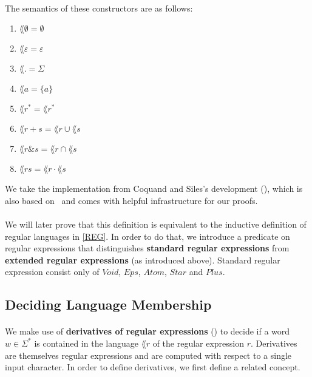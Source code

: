     \paragraph{} 
    The semantics of these constructors are as follows:
    \begin{enumerate}
        \item $\lang{\emptyset} = \emptyset$
        \item $\lang{\varepsilon} = \varepsilon$
        \item $\lang{.} = \Sigma$
        \item $\lang{a} = \{a\}$
        \item $\lang{r^*} = \lang{r}^*$
        \item $\lang{r + s} = \lang{r} \cup \lang{s}$
        \item $\lang{r \& s} = \lang{r} \cap \lang{s}$
        \item $\lang{r s} = \lang{r} \cdot \lang{s}$

    \end{enumerate}

    We take the implementation from Coquand and Siles's development (\cite{DBLP:conf/cpp/CoquandS11}), which is also based on \ssreflect\ and comes with helpful infrastructure for our proofs.



    \paragraph{}
    We will later prove that this definition is equivalent to the inductive definition of regular languages in \ref{REG}.
    In order to do that, we introduce a predicate on regular expressions that distinguishes \textbf{standard regular expressions} 
    from \textbf{extended regular expressions} (as introduced above).
    Standard regular expression consist only of $Void$, $Eps$, $Atom$, $Star$ and $Plus$.




    \subsection{Deciding Language Membership}
    \paragraph{}
    We make use of \textbf{derivatives of regular expressions} (\cite{DBLP:journals/jacm/Brzozowski64}) to decide if a word $w \in \Sigma^*$ is contained in the language $\lang{r}$ of the regular expression $r$. 
    Derivatives are themselves regular expressions and are computed with respect to a single input character. 
    In order to define derivatives, we first define a related concept.

